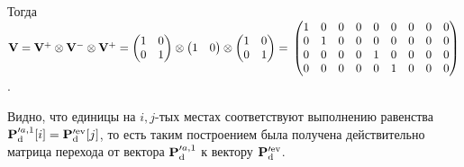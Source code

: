  Тогда $\mathbf{V} = \mathbf{V}^+ \otimes \mathbf{V}^- \otimes \mathbf{V}^+ = 
 \begin{pmatrix} 1 &0 \\ 0 &1 \end{pmatrix} \otimes
  \begin{pmatrix} 1 &0  \end{pmatrix} \otimes
 \begin{pmatrix} 1 &0 \\ 0 & 1 \end{pmatrix} 
 = \\
 \begin{pmatrix} 1 &  0 & 0 & 0 & 0 &  0 & 0 &  0 & 0 \\
                 0 & 1 & 0 & 0 & 0 & 0 & 0 & 0 & 0 \\
                 0 & 0 & 0 & 0 & 1 & 0 & 0 & 0 & 0 \\
                 0 & 0 & 0 & 0 & 0 & 1 & 0 & 0 & 0 \end{pmatrix} $.
                 
                 
Видно, что единицы на $i,j$-тых местах соответствуют выполнению равенства $\mathbf{P}_\mathrm{d}^{\prime a,1} [i]= \mathbf{P}_\mathrm{d}^{\prime \mathrm{ev} }[j]$, то есть таким построением была получена действительно матрица перехода от вектора $\mathbf{P}_\mathrm{d}^{\prime a,1} $ к вектору $\mathbf{P}_\mathrm{d}^{\prime \mathrm{ev} }$.
